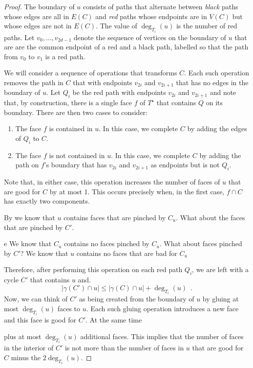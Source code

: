 \documentclass{patmorin}
\newcommand{\dual}[1]{{#1}^\star}
\begin{document}
\begin{proof}
   The boundary of $u$ consists of paths that alternate between
   \emph{black} paths whose edges are all in $E(C)$ and \emph{red}
   paths whose endpoints are in $V(C)$ but whose edges are not in
   $E(C)$.  The value of $\deg_{T_i}(u)$ is the number of red paths.
   Let $v_0,\ldots,v_{2d-1}$ denote the sequence of vertices on the
   boundary of $u$ that are are the common endpoint of a red and a black
   path, labelled so that the path from $v_0$ to $v_1$ is a red path.

   We will consider a sequence of operations that transforms $C$.  Each
   such operation removes the path in $C$ that with endpoints $v_{2i}$
   and $v_{2i+1}$ that has no edges in the boundary of $u$.  Let $Q_i$
   be the red path with endpoints $v_{2i}$ and $v_{2i+1}$ and note that,
   by construction, there is a single face $f$ of $\dual{T}$ that contains
   $Q$ on its boundary.   There are then two cases to consider:
   \begin{enumerate}
       \item The face $f$ is contained in $u$.  In this case, we complete
       $C$ by adding the edges of $Q_i$ to $C$.
       \item The face $f$ is not contained in $u$. In this case,
       we complete $C$ by adding the path on $f$'s boundary that has
       $v_{2i}$ and $v_{2i+1}$ as endpoints but is not $Q_i$.
   \end{enumerate}

   Note that, in either case, this operation increases the number of faces
   of $u$ that are good for $C$ by at most 1.  This occurs precisely when,
   in the first case, $f\cap C$ has exactly two components. 
   
   By  we know that $u$ contains faces that are pinched
   by $C_u$.  What about the faces that are pinched by $C'$. 

 e
   We know that $C_u$ contains no faces pinched by $C_u$.  What about faces pinched by $C'$?  
   We know that $u$ contains no faces that are bad for $C_u$

   Therefore, after performing this operation on each red path $Q_i$,
   we are left with a cycle $C'$ that contains $u$ and.
   \[
       |\gamma(C')\cap u| \le |\gamma(C)\cap u| + \deg_{T_i}(u) \enspace .
   \]
   Now, we can think of $C'$ as being created from the boundary of $u$ by gluing at most $\deg_{T_i}(u)$ faces to $u$.  Each such gluing operation introduces a new face and this face is good for $C'$.  At the same time 

 plus at most $\deg_{T_i}(u)$ additional faces.  This implies that the number of faces in the interior of $C'$ is not more than the number of faces in $u$ that are good for $C$ minus the $2\deg_{T_i}(u)$.

\end{proof}
\end{document}
